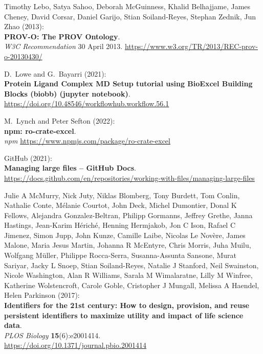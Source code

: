 \begin{thebibliography}{9}
Timothy Lebo, Satya Sahoo, Deborah McGuinness, Khalid Belhajjame, 
James Cheney, David Corsar, Daniel Garijo, Stian Soiland-Reyes, 
Stephan Zednik, Jun Zhao (2013):\\
\textbf{PROV-O: The PROV Ontology}.\\
\emph{W3C Recommendation} 30 April 2013.
\url{https://www.w3.org/TR/2013/REC-prov-o-20130430/}



D.~Lowe and G.~Bayarri (2021):\\
\textbf{Protein Ligand Complex MD Setup tutorial using BioExcel Building
Blocks (biobb) (jupyter notebook)}.\\
\url{https://doi.org/10.48546/workflowhub.workflow.56.1}

M.~Lynch and Peter Sefton (2022):\\
\textbf{npm: ro-crate-excel}.\\
\emph{npm} \url{https://www.npmjs.com/package/ro-crate-excel}

GitHub (2021):\\
\textbf{Managing large files -- GitHub Docs}.\\
\url{https://docs.github.com/en/repositories/working-with-files/managing-large-files}

Julie A McMurry, Nick Juty, Niklas Blomberg, Tony Burdett, Tom
Conlin, Nathalie Conte, Mélanie Courtot, John Deck, Michel Dumontier,
Donal K Fellows, Alejandra Gonzalez-Beltran, Philipp Gormanns, Jeffrey
Grethe, Janna Hastings, Jean-Karim Hériché, Henning Hermjakob, Jon C
Ison, Rafael C Jimenez, Simon Jupp, John Kunze, Camille Laibe, Nicolas
Le Novère, James Malone, Maria Jesus Martin, Johanna R McEntyre, Chris
Morris, Juha Muilu, Wolfgang Müller, Philippe Rocca-Serra,
Susanna-Assunta Sansone, Murat Sariyar, Jacky L Snoep, Stian
Soiland-Reyes, Natalie J Stanford, Neil Swainston, Nicole Washington,
Alan R Williams, Sarala M Wimalaratne, Lilly M Winfree, Katherine
Wolstencroft, Carole Goble, Cristopher J Mungall, Melissa A Haendel,
Helen Parkinson (2017):\\
\textbf{Identifiers for the 21st century: How to design, provision, and
reuse persistent identifiers to maximize utility and impact of life
science data}.\\
\emph{PLOS Biology} \textbf{15}(6):e2001414.\\
\url{https://doi.org/10.1371/journal.pbio.2001414}


\end{thebibliography}

